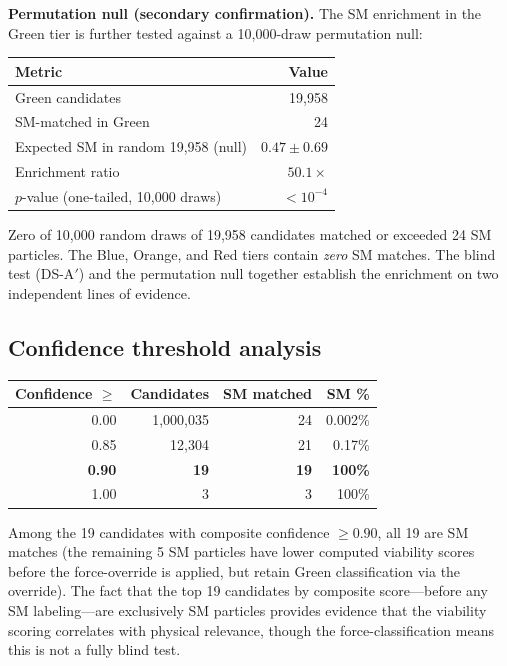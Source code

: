 \documentclass[12pt]{article}
\numberwithin{equation}{section}
\begin{document}
\medskip
\textbf{Permutation null (secondary confirmation).} The SM enrichment in the Green tier is further tested against a 10,000-draw permutation null:

\begin{center}
\begin{tabular}{lr}
\toprule
Metric & Value \\
\midrule
Green candidates & 19,958 \\
SM-matched in Green & 24 \\
Expected SM in random 19,958 (null) & $0.47 \pm 0.69$ \\
Enrichment ratio & $\mathbf{50.1\times}$ \\
$p$-value (one-tailed, 10,000 draws) & $< 10^{-4}$ \\
\bottomrule
\end{tabular}
\end{center}

Zero of 10,000 random draws of 19,958 candidates matched or exceeded 24 SM particles. The Blue, Orange, and Red tiers contain \emph{zero} SM matches. The blind test (DS-A$'$) and the permutation null together establish the enrichment on two independent lines of evidence.

\subsection{Confidence threshold analysis}

\begin{center}
\begin{tabular}{rrrr}
\toprule
Confidence $\geq$ & Candidates & SM matched & SM \% \\
\midrule
0.00 & 1,000,035 & 24 & 0.002\% \\
0.85 & 12,304 & 21 & 0.17\% \\
\textbf{0.90} & \textbf{19} & \textbf{19} & \textbf{100\%} \\
1.00 & 3 & 3 & 100\% \\
\bottomrule
\end{tabular}
\end{center}

Among the 19 candidates with composite confidence $\geq 0.90$, all 19 are SM matches (the remaining 5 SM particles have lower computed viability scores before the force-override is applied, but retain Green classification via the override). The fact that the top 19 candidates by composite score---before any SM labeling---are exclusively SM particles provides evidence that the viability scoring correlates with physical relevance, though the force-classification means this is not a fully blind test.
\end{document}
